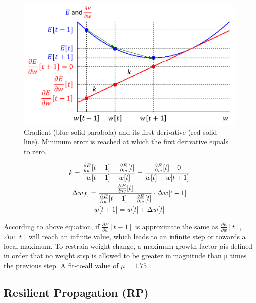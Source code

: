 \documentclass[procedia]{easychair}
\begin{document}
\begin{figure}[tb]
    \begin{centering}
        \includegraphics[scale=0.5]{../../pic/qp.png}
        \caption{Gradient (blue solid parabola) and its first derivative (red solid line).  Minimum error is reached at which the first derivative equals to zero.}
        \label{fig:qp}
	\end{centering}
\end{figure}

\begin{gather}
    k = \frac{ \frac{ \partial E }{ \partial w } [ t - 1 ] - \frac{ \partial E }{ \partial w } [t] }{ w[ t - 1 ] - w[t] } = \frac{ \frac{ \partial E }{ \partial w } [t] - 0 }{ w[t] - w[ t + 1 ] } \notag \\
    \Delta w[t] = \frac{ \frac{ \partial E }{ \partial w } [t] }{ \frac{ \partial E }{ \partial w } [ t - 1 ] - \frac{ \partial E }{ \partial w } [t] } \cdot \Delta w[ t - 1 ] \notag \\
    w[ t + 1 ] = w[t] + \Delta w[t] \notag
\end{gather}

According to above equation, if $\frac{ \partial E }{ \partial w } [ t - 1 ]$ is approximate the same as $\frac{ \partial E }{ \partial w } [t]$, $\Delta w[t]$ will reach an infinite value, which leads to an infinite step or towards a local maximum.  To restrain weight change, a maximum growth factor $\mu$is defined in order that no weight step is allowed to be greater in magnitude than μ times the previous step.  A fit-to-all value of $\mu = 1.75$ \cite{fahlman1988empirical}.

\subsection{Resilient Propagation (RP)}
\end{document}
